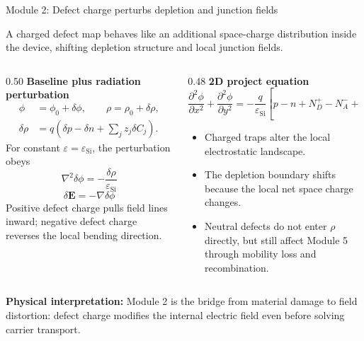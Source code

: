 \documentclass[aspectratio=169,9pt]{beamer}
\newcommand{\Evec}{\bm{E}}
\newcommand{\epsSi}{\varepsilon_{\mathrm{Si}}}
\begin{document}
\begin{frame}{Module 2: Defect charge perturbs depletion and junction fields}
\footnotesize
\vspace{-4mm}
\begin{bluebox}
\centering\small
A charged defect map behaves like an additional space-charge distribution inside the device, shifting depletion structure and local junction fields.
\end{bluebox}

\vspace{1mm}
\begin{columns}[T,totalwidth=\textwidth]
\begin{column}{0.50\textwidth}
\textbf{Baseline plus radiation perturbation}
\begin{align*}
\phi &= \phi_0+\delta\phi,\qquad \rho=\rho_0+\delta\rho,\\[-0.5mm]
\delta\rho &= q\left(\delta p-\delta n+\sum_j z_j\delta C_j\right).
\end{align*}
For constant \(\varepsilon=\epsSi\), the perturbation obeys
\begin{equation*}
\boxed{\nabla^2\delta\phi=-\frac{\delta\rho}{\epsSi}}
\end{equation*}
\begin{equation*}
\boxed{\delta\Evec=-\nabla\delta\phi}
\end{equation*}
\small
Positive defect charge pulls field lines inward; negative defect charge reverses the local bending direction.
\end{column}

\begin{column}{0.48\textwidth}
\textbf{2D project equation}
\begin{equation*}
\boxed{
\frac{\partial^2\phi}{\partial x^2}
+\frac{\partial^2\phi}{\partial y^2}
=-\frac{q}{\epsSi}
\left[p-n+N_D^+-N_A^-+\sum_j z_j C_j\right]}
\end{equation*}
\small
\begin{itemize}\setlength\itemsep{0.2mm}
\item Charged traps alter the local electrostatic landscape.
\item The depletion boundary shifts because the local net space charge changes.
\item Neutral defects do not enter \(\rho\) directly, but still affect Module 5 through mobility loss and recombination.
\end{itemize}
\end{column}
\end{columns}

\vspace{1mm}
\begin{purplebox}
\scriptsize
\textbf{Physical interpretation:} Module 2 is the bridge from material damage to field distortion: defect charge modifies the internal electric field even before solving carrier transport.
\end{purplebox}
\end{frame}
\end{document}
